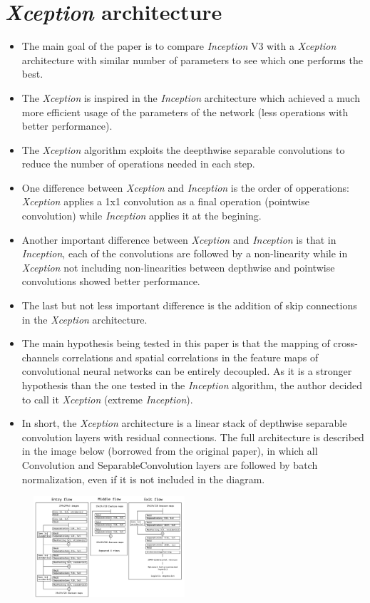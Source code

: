 \documentclass[10pt,a4paper]{article}
\begin{document}
\section*{\textit{Xception} architecture}
\begin{itemize}
\item The main goal of the paper is to compare \textit{Inception} V3 with a \textit{Xception} architecture with similar number of parameters to see which one performs the best.
\item The \textit{Xception} is inspired in the \textit{Inception} architecture which achieved a much more efficient usage of the parameters of the network (less operations with better performance).
\item The \textit{Xception} algorithm exploits the deepthwise separable convolutions to reduce the number of operations needed in each step.
\item One difference between \textit{Xception} and \textit{Inception} is the order of opperations: \textit{Xception} applies a 1x1 convolution as a final operation (pointwise convolution) while \textit{Inception} applies it at the begining. 
\item Another important difference between \textit{Xception} and \textit{Inception} is that in \textit{Inception}, each of the convolutions are followed by a non-linearity while in \textit{Xception} not including non-linearities between depthwise and pointwise convolutions showed better performance.
\item The last but not less important difference is the addition of skip connections in the \textit{Xception} architecture.
\item The main hypothesis being tested in this paper is that the mapping of cross-channels correlations and spatial correlations in the feature maps of convolutional neural networks can be entirely decoupled. As it is a stronger hypothesis than the one tested in the \textit{Inception} algorithm, the author decided to call it \textit{Xception} (extreme \textit{Inception}).
\item In short, the \textit{Xception} architecture is a linear stack of depthwise separable convolution layers with residual connections. The full architecture is described in the image below (borrowed from the original paper), in which all Convolution and SeparableConvolution layers are followed by batch normalization, even if it is not included in the diagram.
\end{itemize}

\begin{figure}[h!]
	\centering
	\includegraphics[width=0.5\textwidth]{img/Xception_architecture.png}
\end{figure}
\end{document}
